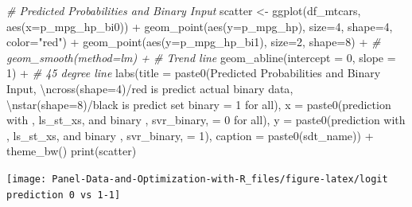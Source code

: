 \documentclass[
]{book}
\newenvironment{Shaded}{\begin{snugshade}}{\end{snugshade}}
\newcommand{\AttributeTok}[1]{\textcolor[rgb]{0.77,0.63,0.00}{#1}}
\newcommand{\CommentTok}[1]{\textcolor[rgb]{0.56,0.35,0.01}{\textit{#1}}}
\newcommand{\DecValTok}[1]{\textcolor[rgb]{0.00,0.00,0.81}{#1}}
\newcommand{\FunctionTok}[1]{\textcolor[rgb]{0.00,0.00,0.00}{#1}}
\newcommand{\NormalTok}[1]{#1}
\newcommand{\OtherTok}[1]{\textcolor[rgb]{0.56,0.35,0.01}{#1}}
\newcommand{\SpecialCharTok}[1]{\textcolor[rgb]{0.00,0.00,0.00}{#1}}
\newcommand{\StringTok}[1]{\textcolor[rgb]{0.31,0.60,0.02}{#1}}
\begin{document}
\begin{Shaded}
\begin{Highlighting}[]
\CommentTok{\# Predicted Probabilities and Binary Input}
\NormalTok{scatter }\OtherTok{\textless{}{-}} \FunctionTok{ggplot}\NormalTok{(df\_mtcars, }\FunctionTok{aes}\NormalTok{(}\AttributeTok{x=}\NormalTok{p\_mpg\_hp\_bi0)) }\SpecialCharTok{+}
      \FunctionTok{geom\_point}\NormalTok{(}\FunctionTok{aes}\NormalTok{(}\AttributeTok{y=}\NormalTok{p\_mpg\_hp), }\AttributeTok{size=}\DecValTok{4}\NormalTok{, }\AttributeTok{shape=}\DecValTok{4}\NormalTok{, }\AttributeTok{color=}\StringTok{"red"}\NormalTok{) }\SpecialCharTok{+}
      \FunctionTok{geom\_point}\NormalTok{(}\FunctionTok{aes}\NormalTok{(}\AttributeTok{y=}\NormalTok{p\_mpg\_hp\_bi1), }\AttributeTok{size=}\DecValTok{2}\NormalTok{, }\AttributeTok{shape=}\DecValTok{8}\NormalTok{) }\SpecialCharTok{+}
      \CommentTok{\# geom\_smooth(method=lm) + \# Trend line}
      \FunctionTok{geom\_abline}\NormalTok{(}\AttributeTok{intercept =} \DecValTok{0}\NormalTok{, }\AttributeTok{slope =} \DecValTok{1}\NormalTok{) }\SpecialCharTok{+} \CommentTok{\# 45 degree line}
      \FunctionTok{labs}\NormalTok{(}\AttributeTok{title =} \FunctionTok{paste0}\NormalTok{(}\StringTok{\textquotesingle{}Predicted Probabilities and Binary Input\textquotesingle{}}\NormalTok{,}
                          \StringTok{\textquotesingle{}}\SpecialCharTok{\textbackslash{}n}\StringTok{cross(shape=4)/red is predict actual binary data\textquotesingle{}}\NormalTok{,}
                          \StringTok{\textquotesingle{}}\SpecialCharTok{\textbackslash{}n}\StringTok{star(shape=8)/black is predict set binary = 1 for all\textquotesingle{}}\NormalTok{),}
            \AttributeTok{x =} \FunctionTok{paste0}\NormalTok{(}\StringTok{\textquotesingle{}prediction with \textquotesingle{}}\NormalTok{, ls\_st\_xs, }\StringTok{\textquotesingle{} and binary \textquotesingle{}}\NormalTok{, svr\_binary, }\StringTok{\textquotesingle{} = 0 for all\textquotesingle{}}\NormalTok{),}
            \AttributeTok{y =} \FunctionTok{paste0}\NormalTok{(}\StringTok{\textquotesingle{}prediction with \textquotesingle{}}\NormalTok{, ls\_st\_xs, }\StringTok{\textquotesingle{} and binary \textquotesingle{}}\NormalTok{, svr\_binary, }\StringTok{\textquotesingle{} = 1\textquotesingle{}}\NormalTok{),}
           \AttributeTok{caption =} \FunctionTok{paste0}\NormalTok{(sdt\_name)) }\SpecialCharTok{+}
      \FunctionTok{theme\_bw}\NormalTok{()}
\FunctionTok{print}\NormalTok{(scatter)}
\end{Highlighting}
\end{Shaded}

\begin{center}\texttt{[image: Panel-Data-and-Optimization-with-R\_files/figure-latex/logit prediction 0 vs 1-1]} \end{center}
\end{document}
